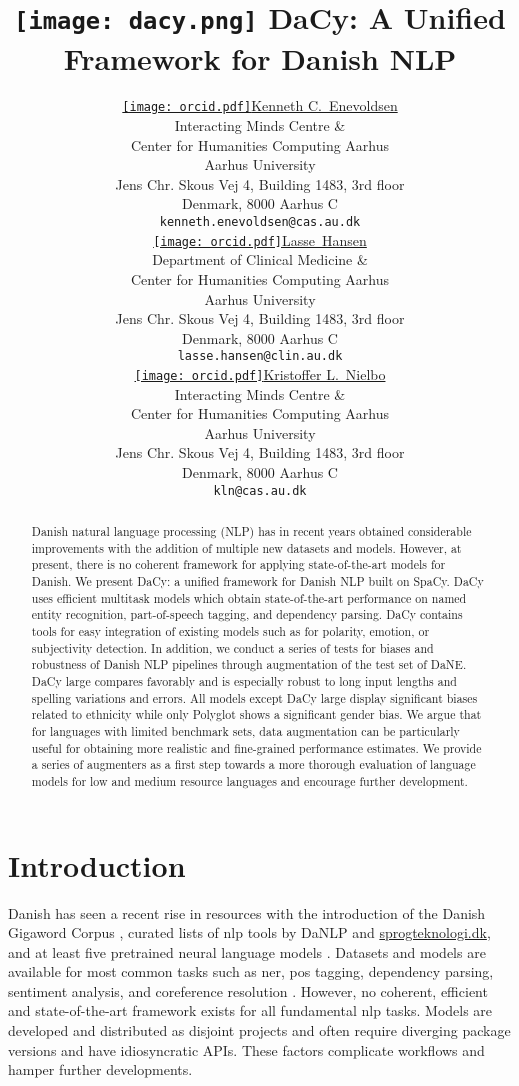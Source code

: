 \documentclass{article}
\title{\texttt{[image: dacy.png]}
DaCy: A Unified Framework for Danish NLP}
\author{ \href{https://orcid.org/0000-0001-8733-0966}{\texttt{[image: orcid.pdf]}\hspace{1mm}Kenneth C.~Enevoldsen}\\
	Interacting Minds Centre \&\\
	Center for Humanities Computing Aarhus\\
	Aarhus University\\
	Jens Chr. Skous Vej 4, Building 1483, 3rd floor\\
    Denmark, 8000 Aarhus C \\
	\texttt{kenneth.enevoldsen@cas.au.dk} \\
\And
	\href{https://orcid.org/0000-0003-1113-4779}{\texttt{[image: orcid.pdf]}\hspace{1mm}Lasse~Hansen} \\
	Department of Clinical Medicine \&\\
	Center for Humanities Computing Aarhus\\
	Aarhus University\\
	Jens Chr. Skous Vej 4, Building 1483, 3rd floor\\
    Denmark, 8000 Aarhus C \\
	\texttt{lasse.hansen@clin.au.dk} \\
	\AND
	\href{https://orcid.org/0000-0002-5116-5070}{\texttt{[image: orcid.pdf]}\hspace{1mm}Kristoffer L.~Nielbo} \\
	Interacting Minds Centre \&\\
	Center for Humanities Computing Aarhus\\
	Aarhus University\\
	Jens Chr. Skous Vej 4, Building 1483, 3rd floor\\
    Denmark, 8000 Aarhus C \\
	\texttt{kln@cas.au.dk} \\
}
\date{}
\begin{document}
\maketitle

\begin{abstract}
Danish natural language processing (NLP) has in recent years obtained considerable improvements with the addition of multiple new datasets and models. However, at present, there is no coherent framework for applying state-of-the-art models for Danish. We present DaCy: a unified framework for Danish NLP built on SpaCy. DaCy uses efficient multitask models which obtain state-of-the-art performance on named entity recognition, part-of-speech tagging, and dependency parsing. DaCy contains tools for easy integration of existing models such as for polarity, emotion, or subjectivity detection. In addition, we conduct a series of tests for biases and robustness of Danish NLP pipelines through augmentation of the test set of DaNE. DaCy large compares favorably and is especially robust to long input lengths and spelling variations and errors. All models except DaCy large display significant biases related to ethnicity while only Polyglot shows a significant gender bias. We argue that for languages with limited benchmark sets, data augmentation can be particularly useful for obtaining more realistic and fine-grained performance estimates. We provide a series of augmenters as a first step towards a more thorough evaluation of language models for low and medium resource languages and encourage further development.
\end{abstract}




\section{Introduction}

Danish  has seen a recent rise in resources with the introduction of the Danish Gigaword Corpus \parencite{derczynski_danish_2021}, curated lists of \gls{nlp} tools by DaNLP \parencite{brogaard_pauli_danlp_2021} and \url{sprogteknologi.dk}, and at least five pretrained neural language models \parencite{hojmark-bertelsen_aelaectra_2021, mollerhoj_danish_2019, tamini-sarnikowski_danish_2020}. Datasets and models are available for most common tasks such as \gls{ner}, \gls{pos} tagging, dependency parsing, sentiment analysis, and coreference resolution \parencite{brogaard_pauli_danlp_2021, sprogteknologi_2021}. However, no coherent, efficient and state-of-the-art framework exists for all fundamental \gls{nlp} tasks. Models are developed and distributed as disjoint projects and often require diverging package versions and have idiosyncratic APIs. These factors complicate workflows and hamper further developments.
\end{document}
